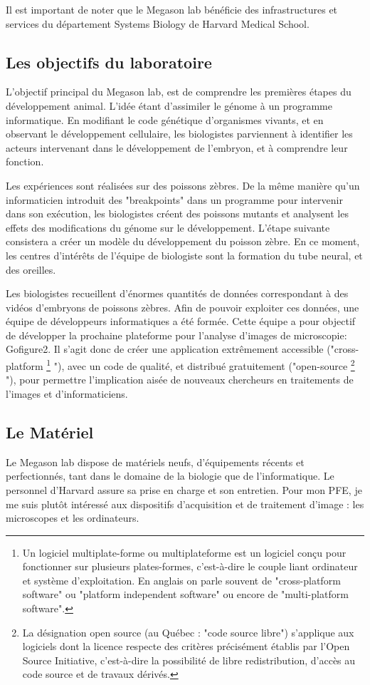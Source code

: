 Il est important de noter que le Megason lab bénéficie des infrastructures et services du département Systems Biology de Harvard Medical School.


\subsection{Les objectifs du laboratoire}
L'objectif principal du Megason lab, est de comprendre les premières étapes du développement animal.
L'idée étant d'assimiler le génome à un programme informatique.
En modifiant le code génétique d'organismes vivants, et en observant le développement cellulaire,
les biologistes parviennent à identifier les acteurs intervenant dans le développement de l'embryon, et à comprendre leur fonction.

Les expériences sont réalisées sur des poissons zèbres.
De la même manière qu'un informaticien introduit des "breakpoints" dans un programme pour intervenir dans son exécution,
les biologistes créent des poissons mutants et analysent les effets des modifications du génome sur le développement.
L'étape suivante consistera a créer un modèle du développement du poisson zèbre.
En ce moment, les centres d'intérêts de l'équipe de biologiste sont la formation du tube neural, et des oreilles.

Les biologistes recueillent d'énormes quantités de données
correspondant à des vidéos d'embryons de poissons zèbres.
Afin de pouvoir exploiter ces données,
une équipe de développeurs informatiques a été formée.
Cette équipe a pour objectif de développer la prochaine plateforme
pour l'analyse d'images de microscopie: Gofigure2.
Il s'agit donc de créer une application extrêmement accessible ("cross-platform
\footnote{Un logiciel multiplate-forme ou multiplateforme est un logiciel conçu pour fonctionner sur plusieurs plates-formes, c'est-à-dire le couple liant ordinateur et système d'exploitation. En anglais on parle souvent de "cross-platform software" ou "platform independent software" ou encore de "multi-platform software".}
"), 
avec un code de qualité,
et distribué gratuitement ("open-source
\footnote{La désignation open source (au Québec : "code source libre") s'applique aux logiciels dont la licence respecte des critères précisément établis par l'Open Source Initiative, c'est-à-dire la possibilité de libre redistribution, d'accès au code source et de travaux dérivés.}
"),
pour permettre l'implication aisée de nouveaux chercheurs
en traitements de l'images et d'informaticiens.

\subsection{Le Matériel} 
Le Megason lab dispose de matériels neufs, d'équipements récents et perfectionnés, tant dans le domaine de la biologie que de l'informatique. Le personnel d'Harvard assure sa prise en charge et son entretien.
Pour mon PFE, je me suis plutôt intéressé aux dispositifs d'acquisition et de traitement d'image : les microscopes et les ordinateurs.

